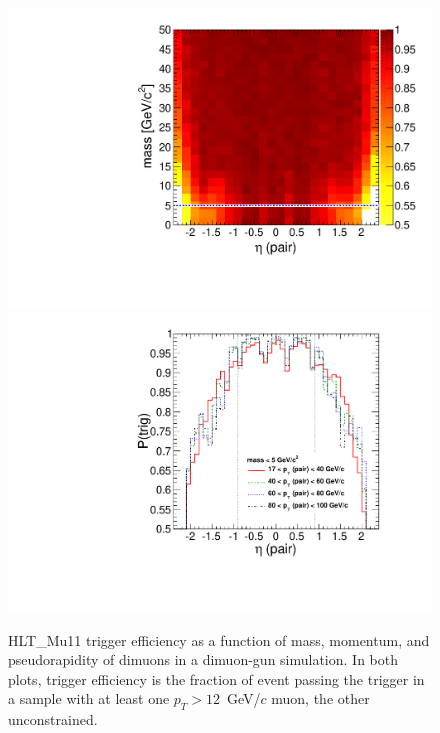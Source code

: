 \documentclass[12pt]{cms-tdr}
\begin{document}
\begin{figure}[p]
\includegraphics[width=0.48\linewidth]{PLOTS/masseta_pluscut_Mu11.pdf} \hfill
\includegraphics[width=0.48\linewidth]{PLOTS/eta_mass5cut_pluscut_Mu11_alt.pdf}

\caption{HLT\_Mu11 trigger efficiency as a function of mass, momentum,
  and pseudorapidity of dimuons in a dimuon-gun simulation.  In both
  plots, trigger efficiency is the fraction of event passing the
  trigger in a sample with at least one $p_T > 12$~GeV/$c$ muon, the
  other unconstrained.  \label{fig:triggersimulation}}
\end{figure}
\end{document}

